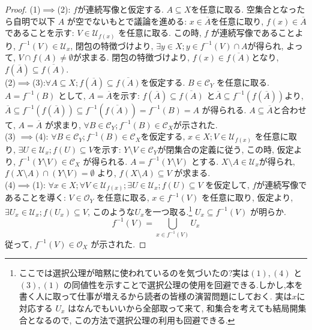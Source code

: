 \documentclass[lualatex]{ltjsbook}
\newcommand{\cl}[1]{\overline{ #1}  }
\theoremstyle{remark}
\theoremstyle{plain}
\begin{document}
\begin{proof}
	(1)$\implies$(2): $f$が連続写像と仮定する. $A \subseteq X$を任意に取る. 空集合となったら自明で以下 $A$ が空でないもとで議論を進める:
$x \in \cl{A}$を任意に取り,  $f(x) \in \cl{A}$であることを示す:
 $V \in \mathcal{U}_{f(x)}$ を任意に取る. 
 この時, $f$ が連続写像であることより, 
 $f^{-1}\left( V \right) \in \mathcal{U}_x$, 
 閉包の特徴づけより, 
 $\exists y \in X; y \in f^{-1}\left( V \right)\cap A$が得られ, 
 よって, $V \cap f(A) \neq \emptyset $が求まる. 
 閉包の特徴づけより, 
 $f(x) \in \cl{f(A)}$となり, $f\left( \cl{A} \right) \subseteq \cl{f\left( A \right) }$.\\
 	(2)$\implies$(3):$\forall A \subseteq X ; f\left( \cl{A} \right) \subseteq \cl{f\left( A \right) }$を仮定する. 
	$B \in \mathcal{C}_Y$ を任意に取る. 
	$A = f^{-1} \left( B \right) $ として, 
	$A = \cl{A}$を示す:
	 $ f\left( \cl{A} \right) \subseteq \cl{f\left( A \right) }  $ と$\cl{A} \subseteq f^{-1}\left( f(\cl{A}) \right)  $より,
	 $\cl{A} \subseteq f^{-1}\left( f(\cl{A}) \right) \subseteq f^{-1}\left( \cl{f\left( A \right) } \right)  = f ^{-1} \left( B \right) = A$ が得られる. 
	 $A \subseteq \cl{A}$と合わせて, $A = \cl{A}$ が求まり,
	 $\forall B \in \mathcal{C}_Y ; f^{-1}\left( B \right)  \in \mathcal{C}_X$が示された.\\
	 (3) $\implies$(4): $\forall B \in \mathcal{C}_Y; f^{-1}\left( B \right)  \in \mathcal{C}_X$を仮定する, 
	 $x \in X ; V \in \mathcal{U}_{f\left( x \right) }$ を任意に取り, $\exists U \in \mathcal{U}_x ; f\left( U \right) \subseteq V$を示す:
	 $Y \setminus V \in \mathcal{C}_Y$が閉集合の定義に従う, 
	 この時, 仮定より, $f^{-1}\left( Y\setminus V \right) \in \mathcal{C}_X$ が得られる. 
	 $A = f^{-1} \left( Y \setminus V \right) $ とする. 
	 $X\setminus A \in \mathcal{U}_x $が得られ, 
	 $f\left( X \setminus A \right) \cap \left( Y \setminus V \right) = \emptyset $ より, 
	 $f\left( X \setminus A \right) \subseteq V$ が求まる. \\
	(4)$\implies$(1): $\forall x \in X; \forall V \in \mathcal{U}_{f(x)};\exists U \in \mathcal{U}_x; f(U) \subseteq V $ を仮定して, $f$が連続写像であることを導く:
	 $V \in \mathcal{O}_Y$ を任意に取る, $x \in f^{-1}\left( V \right) $ を任意に取り, 
 仮定より,$\exists U_x \in \mathcal{U}_x ; f(U_x) \subseteq V$, このような$U_x$を一つ取る.\footnote{ここでは選択公理が暗黙に使われているのを気づいたの?実は$(1),(4)$ と $(3),(1)$ の同値性を示すことで選択公理の使用を回避できる.しかし,本を書く人に取って仕事が増えるから読者の皆様の演習問題にしておく. 実は$x$に対応する $U_x$ はなんでもいいから全部取って来て, 和集合を考えても結局開集合となるので, この方法で選択公理の利用も回避できる.} $U_x \subseteq f^{-1}\left( V \right) $ が明らか. 
	 $$
	 f^{-1}\left( V \right) = \bigcup_{x \in f^{-1}\left( V \right) } U_x
	 $$
	 従って, $f^{-1} \left( V \right) \in \mathcal{O}_X$ が示された.
\end{proof}
\end{document}
